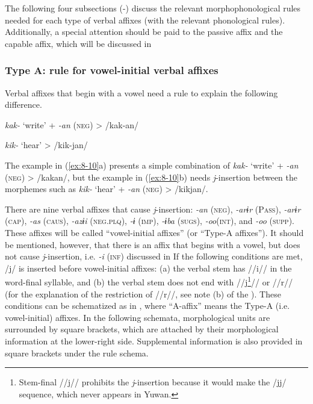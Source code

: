 The following four subsections (-) discuss the relevant morphophonological rules needed for each type of verbal affixes (with the relevant phonological rules). Additionally, a special attention should be paid to the passive affix and the capable affix, which will be discussed in 

\subsubsection{Type A: rule for vowel-initial verbal affixes}

Verbal affixes that begin with a vowel need a rule to explain the following difference.

\ea\label{ex:8-10}
\ea \textit{kak-}  ‘write’  +  \textit{{}-an} (\textsc{neg})  >  /kak-an/

\ex \textit{kik-}  ‘hear’        >  /kik-jan/
\z
\z

The example in (\ref{ex:8-10}a) presents a simple combination of \textit{kak-} ‘write’ + \textit{{}-an} (\textsc{neg}) > /kakan/, but the example in (\ref{ex:8-10}b) needs \textit{j}{}-insertion between the morphemes such as \textit{kik-} ‘hear’ + \textit{{}-an} (\textsc{neg}) > /kikjan/.

There are nine verbal affixes that cause \textit{j}{}-insertion: \textit{{}-an} (\textsc{neg}), \textit{{}-arɨr} (P\textsc{ass}), \textit{{}-arɨr} (\textsc{cap}), \textit{{}-as} (\textsc{caus}), \textit{{}-azɨi} (\textsc{neg}.\textsc{plq}), \textit{{}-ɨ} (\textsc{imp}), \textit{{}-ɨba} (\textsc{sugs}), \textit{{}-oo}(\textsc{int}), and \textit{{}-oo} (\textsc{supp}). These affixes will be called “vowel-initial affixes” (or “Type-A affixes”). It should be mentioned, however, that there is an affix that begins with a vowel, but does not cause \textit{j}{}-insertion, i.e. \textit{{}-i} (\textsc{inf}) discussed in  If the following conditions are met, /j/ is inserted before vowel-initial affixes: (a) the verbal stem has //i// in the word-final syllable, and (b) the verbal stem does not end with //j\footnote{Stem-final //j// prohibits the \textit{j}{}-insertion because it would make the /jj/ sequence, which never appears in Yuwan.}// or //r// (for the explanation of the restriction of //r//, see note (b) of the ). These conditions can be schematized as in , where “A-affix” means the Type-A (i.e. vowel-initial) affixes. In the following schemata, morphological units are surrounded by square brackets, which are attached by their morphological information at the lower-right side. Supplemental information is also provided in square brackets under the rule schema.

